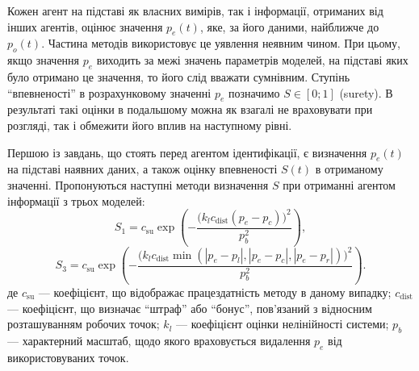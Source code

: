 \documentclass[a4paper,13pt]{atuaref}
\begin{document}
Кожен агент на підставі як власних вимірів, так і інформації, отриманих від
інших агентів, оцінює значення $p_e (t)$, яке, за його даними, найближче до
$p_o (t) $. Частина методів використовує це уявлення неявним чином. При цьому,
якщо значення $ p_e $ виходить за межі значень параметрів моделей, на підставі
яких було отримано це значення, то його слід вважати сумнівним.
Ступінь ``впевненості'' в розрахунковому значенні $p_e$ позначимо $ S \in [0; 1] $ (surety).
В результаті такі оцінки в подальшому можна як
взагалі не враховувати при розгляді, так і обмежити його вплив на наступному
рівні.


Першою із завдань, що стоять перед агентом ідентифікації, є визначення $ p_e(t) $
на підставі наявних даних, а також оцінку впевненості $ S(t) $ в
отриманому значенні.
Пропонуються наступні
методи визначення $S$ при отриманні агентом інформації з трьох моделей:
%
\begin{equation}
  S_1 = c_\mathrm{su} \exp \left( - \frac{ \big( k_l c_\mathrm{dist} ( p_e - p_c ) \big)^2 }{p_b^2} \right)
  ,
  \label{atu:eq:S1}
\end{equation}
%
\begin{equation}
  S_3 = c_\mathrm{su} \exp \left( - \frac{ \big( k_l c_\mathrm{dist} \min( |p_e - p_l|,|p_e - p_c|, |p_e - p_r| ) \big)^2 }{p_b^2} \right)
  .
  \label{atu:eq:S3}
\end{equation}
%
де
$c_\mathrm{su}$ ---
коефіцієнт, що відображає працездатність методу в даному випадку;
$c_\mathrm{dist}$ ---
коефіцієнт, що визначає ``штраф'' або ``бонус'', пов'язаний з відносним розташуванням робочих точок;
$k_l$ ---
коефіцієнт оцінки нелінійності системи;
$p_b$
--- характерний масштаб, щодо якого враховується видалення $ p_e $ від використовуваних точок.

\end{document}
